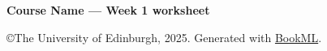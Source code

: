 \documentclass[12pt,oneside]{book}
\newcommand\coursename{Course Name}
\newcommand\weeknumber{1}
\newcommand\coursedescription{Week \weeknumber{} worksheet}
\begin{document}
\setcounter{week}{\weeknumber}
{\Huge\textbf{\coursename{} --- \coursedescription}}





\iflatexml
    \copyright The University of Edinburgh, 2025. Generated with \href{https://vlmantova.github.io/bookml/}{BookML}.
\fi
\end{document}
